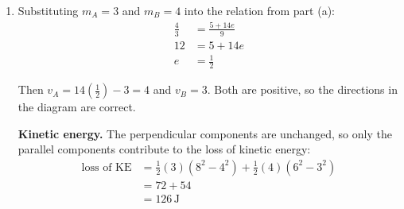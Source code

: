 \documentclass[leqno]{article}
\begin{document}
\begin{enumerate}[
  label=\textbf{\arabic*.},
  leftmargin=*,
  topsep=0pt,
  partopsep=0pt,
  parsep=0pt
]
\begin{djsSolution}
\begin{enumerate}[label=\textbf{(\alph*)}, start=1]
\textbf{Parallel to the line of centres.} After the collision, let \(A\) move to the left with speed \(v_A\) and \(B\) move to the right with speed \(v_B\), as in the diagram. Conservation of momentum, taking left to right as positive:
\[
8m_A-6m_B=-m_Av_A+m_Bv_B
\]

Newton's law of restitution:
\[
e=\frac{\text{speed of separation}}{\text{speed of approach}}=\frac{v_A+v_B}{8+6}
\]

\textbf{Motion of \(B\) after the collision.} The perpendicular component of \(B\) is still \(6\,\mathrm{m\,s^{-1}}\) upwards, and \(B\) moves at an angle \(\beta\) to the rightward line of centres, so
\begin{align*}
\tan\beta&=\frac{6}{v_B}=2\\
v_B&=3
\end{align*}

Newton's law of restitution then gives \(v_A+3=14e\), so \(v_A=14e-3\). This is negative when \(e<\frac{3}{14}\): \(A\) then in fact moves to the right, with speed \(3-14e\), and the equations above still hold with \(v_A\) negative. Substituting into the momentum equation:
\begin{align*}
8m_A-6m_B&=-m_A(14e-3)+3m_B\\
(5+14e)m_A&=9m_B\\
\frac{m_B}{m_A}&=\frac{5+14e}{9}
\end{align*}

\textbf{Range of \(\frac{m_B}{m_A}\).} Since \(0\leq e\leq1\), and \(\frac{5+14e}{9}\) increases continuously with \(e\), from \(\frac59\) at \(e=0\) to \(\frac{19}{9}\) at \(e=1\), the complete interval is
\[
\frac59\leq\frac{m_B}{m_A}\leq\frac{19}{9}
\]

The upper endpoint \(\frac{19}{9}\) corresponds to \(e=1\), a perfectly elastic collision.

\item Substituting \(m_A=3\) and \(m_B=4\) into the relation from part (a):
\begin{align*}
\frac43&=\frac{5+14e}{9}\\
12&=5+14e\\
e&=\frac12
\end{align*}

Then \(v_A=14\left(\frac12\right)-3=4\) and \(v_B=3\). Both are positive, so the directions in the diagram are correct.

\textbf{Kinetic energy.} The perpendicular components are unchanged, so only the parallel components contribute to the loss of kinetic energy:
\begin{align*}
\text{loss of KE}&=\frac12(3)\left(8^2-4^2\right)+\frac12(4)\left(6^2-3^2\right)\\
&=72+54\\
&=126\,\mathrm{J}
\end{align*}


\end{enumerate}
\end{djsSolution}
\end{enumerate}
\end{document}
